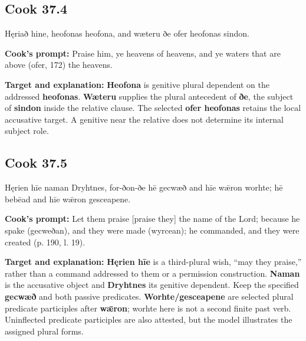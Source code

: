 \par\begin{minipage}{\linewidth}\raggedright
\subsection*{Cook 37.4}

Hęriað hine, heofonas heofona, and wæteru ðe ofer heofonas sindon.

\textbf{Cook's prompt:} Praise him, ye heavens of heavens, and ye waters that are above (ofer, 172) the heavens.

\textbf{Target and explanation:} \textbf{Heofona} is genitive plural dependent on the addressed \textbf{heofonas}. \textbf{Wæteru} supplies the plural antecedent of \textbf{ðe}, the subject of \textbf{sindon} inside the relative clause. The selected \textbf{ofer heofonas} retains the local accusative target. A genitive near the relative does not determine its internal subject role.

\end{minipage}\par\addvspace{4pt}

\par\begin{minipage}{\linewidth}\raggedright
\subsection*{Cook 37.5}

Hęrien hīe naman Dryhtnes, for-ðon-ðe hē gecwæð and hīe wǣron worhte; hē bebēad and hīe wǣron gesceapene.

\textbf{Cook's prompt:} Let them praise [praise they] the name of the Lord; because he spake (gecweðan), and they were made (wyrcean); he commanded, and they were created (p. 190, l. 19).

\textbf{Target and explanation:} \textbf{Hęrien hīe} is a third-plural wish, “may they praise,” rather than a command addressed to them or a permission construction. \textbf{Naman} is the accusative object and \textbf{Dryhtnes} its genitive dependent. Keep the specified \textbf{gecwæð} and both passive predicates. \textbf{Worhte/\allowbreak{}gesceapene} are selected plural predicate participles after \textbf{wǣron}; worhte here is not a second finite past verb. Uninflected predicate participles are also attested, but the model illustrates the assigned plural forms.

\end{minipage}\par\addvspace{4pt}

